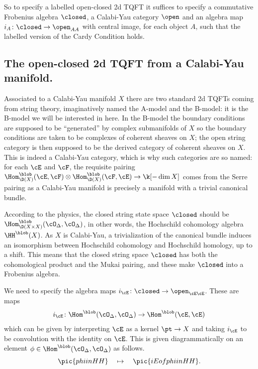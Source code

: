 So to specify a labelled open-closed 2d TQFT it suffices to specify a
commutative Frobenius algebra $\closed$, a Calabi-Yau category $\open$
and an algebra map $i_A\colon \closed\to \open_{AA}$ with central
image, for each object $A$, such that the labelled version of the
Cardy Condition holds.

 \subsection{The open-closed 2d TQFT from a Calabi-Yau
  manifold.}
Associated to a Calabi-Yau manifold $X$ there are two standard 2d TQFTs
coming from string theory, imaginatively named the 
A-model and the B-model:  it is the B-model we will be
interested in here.  In the B-model the boundary conditions are
supposed to be ``generated'' by complex submanifolds of $X$ so the boundary conditions are
taken to be complexes of coherent sheaves on $X$;  the open string
category is then supposed to be the derived category of coherent sheaves on
$X$.  This is indeed a Calabi-Yau category, which is why such
categories are so named:  for each $\cE$ and $\cF$, the requisite pairing
$\Hom^\blob_{\D(X)}(\cE,\cF)\otimes \Hom^\blob_{\D(X)}(\cF,\cE)\to
\k[-\dim X]$ comes from the Serre pairing as a Calabi-Yau
manifold is precisely a manifold with a trivial canonical bundle.


According to the physics, the closed string state space $\closed$ should be $\Hom^\blob_{\D(X\times X)}(\cO_\Delta,\cO_\Delta)$, in other words, the
Hochschild cohomology algebra
 $\HH^\blob(X)$.
As $X$ is Calabi-Yau, a trivialization of the canonical bundle induces
an isomorphism between Hochschild cohomology and Hochschild homology,
up to a shift. This means that the closed string space $\closed$
has both the cohomological product and the Mukai pairing, and these make  $\closed$ into a
Frobenius algebra.

We need to specify the algebra maps $i_\cE\colon \closed \to
\open_{\cE\cE}$.  These are maps
\[ i_\cE\colon \Hom^\blob(\cO_\Delta,\cO_\Delta)\to
\Hom^\blob(\cE,\cE) \]
which can be given by interpreting $\cE$  as a kernel $\pt\to X$ and taking $i_\cE$ to be convolution with the identity on $\cE$. This is given
diagrammatically on an element
$\phi\in\Hom^\blob(\cO_\Delta,\cO_\Delta)$ as follows.
\[\pic{phiinHH}\quad\mapsto\quad \pic{iEofphiinHH}.\]


